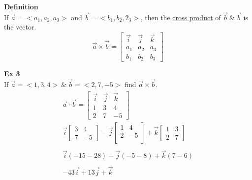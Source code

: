 \documentclass{article}
\begin{document}
  \textbf{Definition}\\
  If $ \vec{ a }  = < a_1, a_2, a_3> $ and $ \vec{ b } = < b_1, b_2, 2_3>   $, then the \underline{cross product} of $ \vec{ b } ~\&~ \vec{ b }   $ is the vector.
  \[
    \vec{a} \times \vec{ b } =
    \begin{bmatrix}
      \vec{ i } & \vec{ j } & \vec{ k }\\
      a_1 &a_2 &a_3\\
      b_1 &b_2 &b_3
    \end{bmatrix}
  \]
  
  \textbf{Ex 3}\\
  If $ \vec{ a } = < 1, 3, 4>   ~ \&~ \vec{ b } = < 2, 7, -5>  $ find $ \vec{ a } \times \vec{b }$.
  \[
    \begin{gathered}
    \vec{ a } \cdot \vec{ b } =
    \begin{bmatrix}
      \vec{ i } & \vec{ j } & \vec{ k }  \\
      1 &3 &4\\
      2 &7 &-5
    \end{bmatrix}\\
    \vec{ i } 
    \begin{bmatrix}
      3 & 4\\
      7 &-5
    \end{bmatrix} -
    \vec{j} \begin{bmatrix}
      1 &4 \\
      2 &-5\\
    \end{bmatrix} +
    \vec{k} \begin{bmatrix}
      1 & 3\\
      2 & 7
    \end{bmatrix}\\
    ~\\
    \vec{i} (-15-28) - \vec{j}(-5-8) + \vec{k}(7-6)\\
    ~\\
    \boxed{-43\vec{i} + 13\vec{j} + \vec{k}} 
    \end{gathered}
  \]
\end{document}
